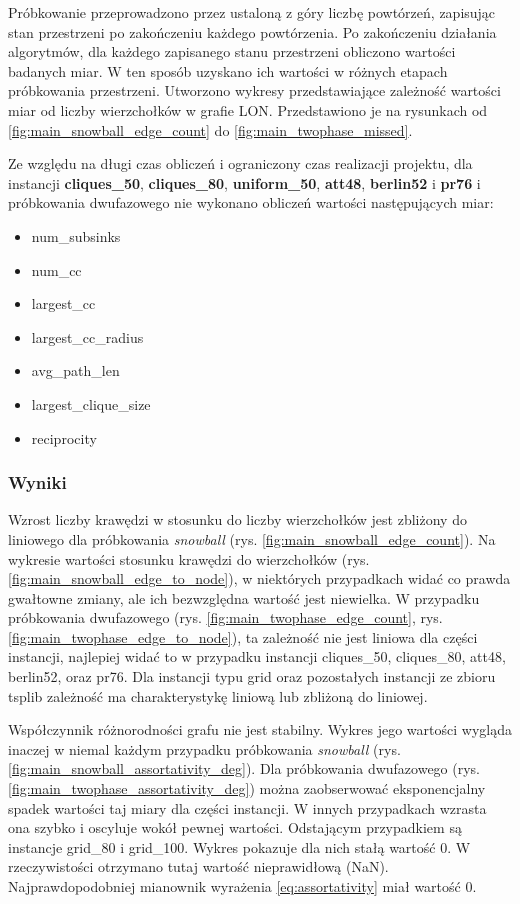 Próbkowanie przeprowadzono przez ustaloną z góry liczbę powtórzeń, zapisując stan przestrzeni po zakończeniu każdego powtórzenia.
Po zakończeniu działania algorytmów, dla każdego zapisanego stanu przestrzeni obliczono wartości badanych miar. W ten sposób uzyskano
ich wartości w różnych etapach próbkowania przestrzeni.
Utworzono wykresy przedstawiające zależność wartości miar od liczby wierzchołków w grafie LON.
Przedstawiono je na rysunkach od \ref{fig:main_snowball_edge_count} do \ref{fig:main_twophase_missed}.

Ze względu na długi czas obliczeń i ograniczony czas realizacji projektu,
dla instancji \textbf{cliques\_50}, \textbf{cliques\_80}, \textbf{uniform\_50}, \textbf{att48}, \textbf{berlin52} i \textbf{pr76} i próbkowania dwufazowego
nie wykonano obliczeń wartości następujących miar:

\begin{itemize}
    \item num\_subsinks
    \item num\_cc
    \item largest\_cc
    \item largest\_cc\_radius
    \item avg\_path\_len
    \item largest\_clique\_size
    \item reciprocity
\end{itemize}

\subsubsection{Wyniki}

Wzrost liczby krawędzi w stosunku do liczby wierzchołków jest zbliżony do liniowego dla próbkowania \textit{snowball} (rys. \ref{fig:main_snowball_edge_count}).
Na wykresie wartości stosunku krawędzi do wierzchołków (rys. \ref{fig:main_snowball_edge_to_node}), w niektórych przypadkach widać co prawda gwałtowne zmiany, ale
ich bezwzględna wartość jest niewielka.
W przypadku próbkowania dwufazowego (rys. \ref{fig:main_twophase_edge_count}, rys.\ref{fig:main_twophase_edge_to_node}), ta zależność nie jest liniowa dla części instancji,
najlepiej widać to w przypadku instancji cliques\_50, cliques\_80, att48, berlin52, oraz pr76.
Dla instancji typu grid oraz pozostałych instancji ze zbioru tsplib zależność ma charakterystykę liniową lub zbliżoną do liniowej.

Współczynnik różnorodności grafu nie jest stabilny. Wykres jego wartości wygląda inaczej w niemal każdym przypadku
próbkowania \textit{snowball} (rys. \ref{fig:main_snowball_assortativity_deg}).
Dla próbkowania dwufazowego (rys. \ref{fig:main_twophase_assortativity_deg}) można zaobserwować eksponencjalny spadek wartości taj miary dla części instancji.
W innych przypadkach wzrasta ona szybko i oscyluje wokół pewnej wartości.
Odstającym przypadkiem są instancje grid\_80 i grid\_100. Wykres pokazuje dla nich stałą wartość 0.
W rzeczywistości otrzymano tutaj wartość nieprawidłową (NaN). Najprawdopodobniej mianownik wyrażenia \ref{eq:assortativity}
miał wartość 0.

